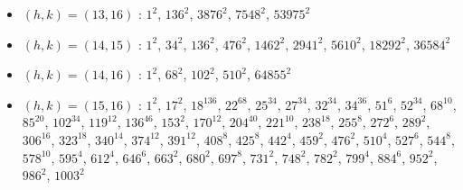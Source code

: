 \begin{itemize}
\item $(h,k)=(13,16)$ : $1^{2}$, $136^{2}$, $3876^{2}$, $7548^{2}$, $53975^{2}$
\item $(h,k)=(14,15)$ : $1^{2}$, $34^{2}$, $136^{2}$, $476^{2}$, $1462^{2}$, $2941^{2}$, $5610^{2}$, $18292^{2}$, $36584^{2}$
\item $(h,k)=(14,16)$ : $1^{2}$, $68^{2}$, $102^{2}$, $510^{2}$, $64855^{2}$
\item $(h,k)=(15,16)$ : $1^{2}$, $17^{2}$, $18^{136}$, $22^{68}$, $25^{34}$, $27^{34}$, $32^{34}$, $34^{36}$, $51^{6}$, $52^{34}$, $68^{10}$, $85^{20}$, $102^{34}$, $119^{12}$, $136^{46}$, $153^{2}$, $170^{12}$, $204^{40}$, $221^{10}$, $238^{18}$, $255^{8}$, $272^{6}$, $289^{2}$, $306^{16}$, $323^{18}$, $340^{14}$, $374^{12}$, $391^{12}$, $408^{8}$, $425^{8}$, $442^{4}$, $459^{2}$, $476^{2}$, $510^{4}$, $527^{6}$, $544^{8}$, $578^{10}$, $595^{4}$, $612^{4}$, $646^{6}$, $663^{2}$, $680^{2}$, $697^{8}$, $731^{2}$, $748^{2}$, $782^{2}$, $799^{4}$, $884^{6}$, $952^{2}$, $986^{2}$, $1003^{2}$
\end{itemize}
